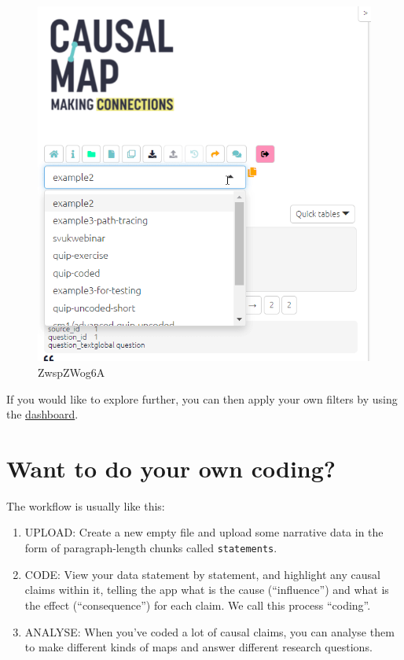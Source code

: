 \documentclass[
]{book}
\providecommand{\tightlist}{%
  \setlength{\itemsep}{0pt}\setlength{\parskip}{0pt}}
\begin{document}
\begin{figure}
\centering
\includegraphics[width=6.77083in,height=\textheight]{_assets/ZwspZWog6A.gif}
\caption{ZwspZWog6A}
\end{figure}

If you would like to explore further, you can then apply your own filters by using the \protect\hyperlink{xdashboard}{dashboard}.

\hypertarget{want-to-do-your-own-coding}{%
\chapter{Want to do your own coding?}\label{want-to-do-your-own-coding}}

The workflow is usually like this:

\begin{enumerate}
\def\labelenumi{\arabic{enumi}.}
\tightlist
\item
  UPLOAD: Create a new empty file and upload some narrative data in the form of paragraph-length chunks called \texttt{statements}.
\item
  CODE: View your data statement by statement, and highlight any causal claims within it, telling the app what is the cause (``influence'') and what is the effect (``consequence'') for each claim. We call this process ``coding''.
\item
  ANALYSE: When you've coded a lot of causal claims, you can analyse them to make different kinds of maps and answer different research questions.
\end{enumerate}
\end{document}

